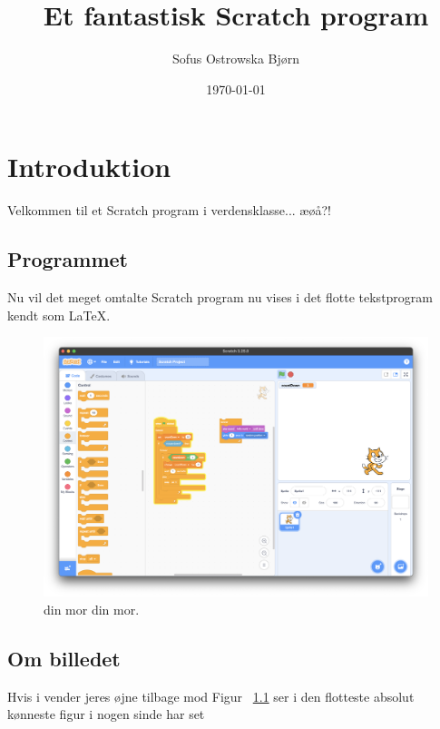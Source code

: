 \documentclass[a4paper]{report}
\begin{document}
\title{Et fantastisk Scratch program}
\author{Sofus Ostrowska Bjørn}
\date{\today}
\maketitle
\chapter{Introduktion}

Velkommen til et Scratch program i verdensklasse... æøå?!

\section{Programmet}

Nu vil det meget omtalte Scratch program nu vises i det flotte
tekstprogram kendt som \LaTeX.

\begin{figure}[h]
\includegraphics[width=\linewidth]{Evidence.png}
\caption{din mor din mor.}
\label{fig 1}
\end{figure}

\newpage

\section{Om billedet}

Hvis i vender jeres øjne tilbage mod Figur ~\ref{fig 1} ser i den
flotteste absolut kønneste figur i nogen sinde har set
\end{document}
